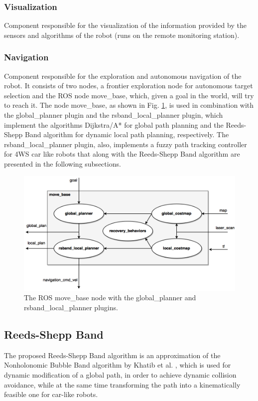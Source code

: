 \documentclass[conference]{IEEEtran}
\begin{document}
\subsubsection{Visualization}
Component responsible for the visualization of the information provided by the sensors and algorithms of the robot (runs on the remote monitoring station).
\subsubsection{Navigation}
Component responsible for the exploration and autonomous navigation of the robot. It consists of two nodes, a frontier exploration node for autonomous target selection and the ROS node move\_base, which, given a goal in the world, will try to reach it. The node move\_base, as shown in Fig. \ref{fig:move_base}, is used in combination with the global\_planner plugin and the rsband\_local\_planner plugin, which implement the algorithms Dijkstra/A* for global path planning and the Reeds-Shepp Band algorithm for dynamic local path planning, respectively. The rsband\_local\_planner plugin, also, implements a fuzzy path tracking controller for 4WS car like robots that along with the Reeds-Shepp Band algorithm are presented in the following subsections.

\begin{figure}[!ht]
	\centering
	\includegraphics[width=\linewidth]{Figures/move_base_3.png}%
	\caption{The ROS move\_base node with the global\_planner and\;\;\;\;\;\;\;\;\;\;\;\;\;\;\;\;\;\; rsband\_local\_planner plugins.}
	\label{fig:move_base}
\end{figure}

\subsection{Reeds-Shepp Band}
The proposed Reeds-Shepp Band algorithm is an approximation of the Nonholonomic Bubble Band algorithm by Khatib et al. \cite{dpm}, which is used for dynamic modification of a global path, in order to achieve dynamic collision avoidance, while at the same time transforming the path into a kinematically feasible one for car-like robots.
\end{document}
